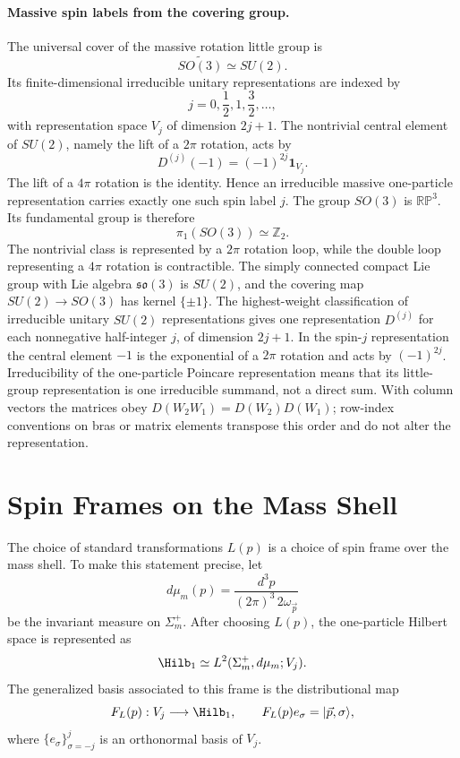 \paragraph{Massive spin labels from the covering group.}
The universal cover of the massive rotation little group is
\[
  \widetilde{SO(3)}\simeq SU(2).
\]
Its finite-dimensional irreducible unitary representations are indexed by
\[
  j=0,\frac12,1,\frac32,\ldots ,
\]
with representation space \(V_j\) of dimension \(2j+1\). The nontrivial
central element of \(SU(2)\), namely the lift of a \(2\pi\) rotation, acts by
\[
  D^{(j)}(-1)=(-1)^{2j}\mathbf 1_{V_j}.
\]
The lift of a \(4\pi\) rotation is the identity.  Hence an irreducible massive
one-particle representation carries exactly one such spin label \(j\).
The group \(SO(3)\) is \(\mathbb{RP}^3\). Its fundamental group is therefore
\[
  \pi_1(SO(3))\simeq \mathbb Z_2 .
\]
The nontrivial class is represented by a \(2\pi\) rotation loop, while the
double loop representing a \(4\pi\) rotation is contractible. The simply
connected compact Lie group with Lie algebra \(\mathfrak{so}(3)\) is
\(SU(2)\), and the covering map \(SU(2)\to SO(3)\) has kernel
\(\{\pm 1\}\).  The highest-weight classification of irreducible unitary
\(SU(2)\) representations gives one representation \(D^{(j)}\) for
each nonnegative half-integer \(j\), of dimension \(2j+1\).  In the
spin-\(j\) representation the central element \(-1\) is the exponential of a
\(2\pi\) rotation and acts by \((-1)^{2j}\).  Irreducibility of the
one-particle Poincare representation means that its little-group
representation is one irreducible summand, not a direct sum.  With column
vectors the matrices obey \(D(W_2W_1)=D(W_2)D(W_1)\); row-index conventions on
bras or matrix elements transpose this order and do not alter the
representation.

\section{Spin Frames on the Mass Shell}

\begin{definition}
\label{def:massive-spin-frame}
The choice of standard transformations \(L(p)\) is a choice of spin frame over
the mass shell. To make this statement precise, let
\[
  d\mu_m(p)=\frac{d^3p}{(2\pi)^3\,2\omega_{\vec p}}
\]
be the invariant measure on \(\Sigma_m^+\). After choosing \(L(p)\), the
one-particle Hilbert space is represented as
\[
  \Hilb_1\simeq L^2(\Sigma_m^+,d\mu_m;V_j).
\]
The generalized basis associated to this frame is the distributional map
\[
  F_L(p):V_j\longrightarrow \Hilb_1,
  \qquad
  F_L(p)e_\sigma=|\vec p,\sigma\rangle ,
\]
where \(\{e_\sigma\}_{\sigma=-j}^j\) is an orthonormal basis of \(V_j\).
\end{definition}

